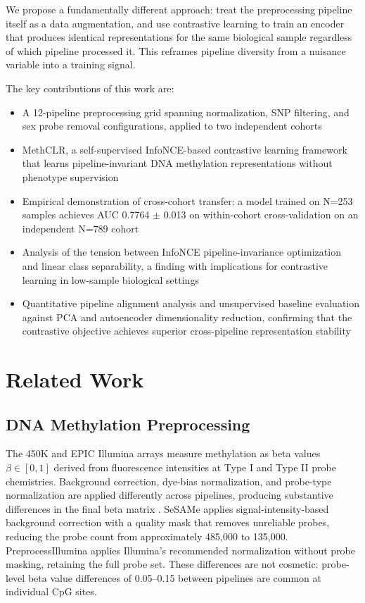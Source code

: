 \documentclass[conference]{IEEEtran}
\begin{document}
We propose a fundamentally different approach: treat the preprocessing pipeline itself as a data augmentation, and use contrastive learning to train an encoder that produces identical representations for the same biological sample regardless of which pipeline processed it. This reframes pipeline diversity from a nuisance variable into a training signal.

The key contributions of this work are:
\begin{itemize}
    \item A 12-pipeline preprocessing grid spanning normalization, SNP filtering, and sex probe removal configurations, applied to two independent cohorts
    \item MethCLR, a self-supervised InfoNCE-based contrastive learning framework that learns pipeline-invariant DNA methylation representations without phenotype supervision
    \item Empirical demonstration of cross-cohort transfer: a model trained on N=253 samples achieves AUC 0.7764 $\pm$ 0.013 on within-cohort cross-validation on an independent N=789 cohort
    \item Analysis of the tension between InfoNCE pipeline-invariance optimization and linear class separability, a finding with implications for contrastive learning in low-sample biological settings
    \item Quantitative pipeline alignment analysis and unsupervised baseline evaluation against PCA and autoencoder dimensionality reduction, confirming that the contrastive objective achieves superior cross-pipeline representation stability
\end{itemize}

\section{Related Work}

\subsection{DNA Methylation Preprocessing}
The 450K and EPIC Illumina arrays measure methylation as beta values $\beta \in [0,1]$ derived from fluorescence intensities at Type I and Type II probe chemistries. Background correction, dye-bias normalization, and probe-type normalization are applied differently across pipelines, producing substantive differences in the final beta matrix \cite{fortin2014}. SeSAMe \cite{zhou2018} applies signal-intensity-based background correction with a quality mask that removes unreliable probes, reducing the probe count from approximately 485,000 to 135,000. PreprocessIllumina \cite{aryee2014} applies Illumina's recommended normalization without probe masking, retaining the full probe set. These differences are not cosmetic: probe-level beta value differences of 0.05--0.15 between pipelines are common at individual CpG sites.
\end{document}
